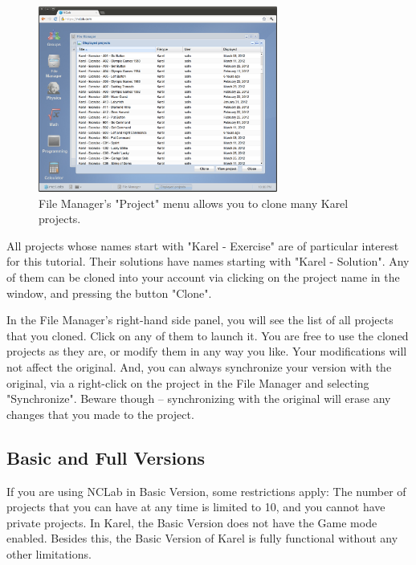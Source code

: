 \documentclass[article,A4,12pt]{llncs}
\begin{document}
\begin{figure}[!ht]
\begin{center}
\includegraphics[width=0.7\textwidth]{img/cloning.png}
\end{center}
\caption{File Manager's "Project" menu allows you to clone many Karel projects.}
\label{fig:cloning}
\end{figure}
\noindent
All projects whose names start with "Karel - Exercise" are of particular interest 
for this tutorial. Their solutions have names starting with "Karel - Solution". 
Any of them can be cloned into your account via clicking on the project name in the window, 
and pressing the button "Clone".

In the File Manager's right-hand side panel, you will see the list of all 
projects that you cloned. Click on any of them to launch it. You are free to 
use the cloned projects as they are, or modify them in any way you like. Your 
modifications will not affect the original. And, you can 
always synchronize your version with the original, via 
a right-click on the project in the File Manager and selecting "Synchronize".
Beware though -- synchronizing with the original will erase any changes that 
you made to the project.

\subsection{Basic and Full Versions}

If you are using NCLab in Basic Version, some restrictions apply: The 
number of projects that you can have at any time is limited to 10, and you cannot have
private projects. In Karel, the Basic Version does not have the Game mode 
enabled. Besides this, the Basic Version of Karel is fully functional without any other 
limitations. 
\end{document}

